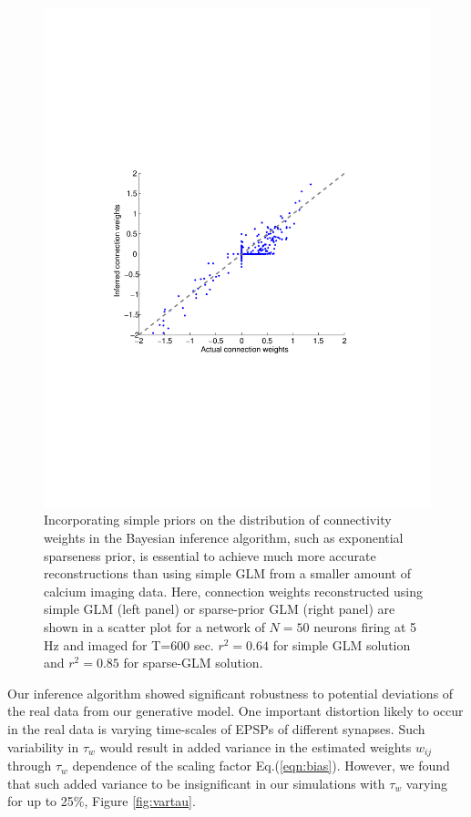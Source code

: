 \begin{figure}[h]
\begin{minipage}[c]{0.45\hsize}
\includegraphics[width=\hsize]{../figs/FigureA10_sparse_sol}
\end{minipage}
\caption{Incorporating simple priors on the distribution of connectivity weights in the Bayesian inference algorithm, such as exponential sparseness prior, is essential to achieve much more accurate reconstructions than using simple GLM from a smaller amount of calcium imaging data. Here, connection weights reconstructed using simple GLM (left panel) or sparse-prior GLM (right panel) are shown in a scatter plot for a network of $N=50$ neurons firing at 5 Hz and imaged for T=600 sec. $r^2=0.64$ for simple GLM solution and $r^2=0.85$ for sparse-GLM solution.}
\label{fig:sparse}
\end{figure}

Our inference algorithm showed significant robustness to potential deviations of the real data from our generative model.
One important distortion likely to occur in the real data is varying time-scales of EPSPs of different synapses.
Such variability in $\tau_w$ would result in added variance in the estimated weights $w_{ij}$ through $\tau_w$ dependence of the scaling factor Eq.(\ref{eqn:bias}).
However, we found that such added variance to be insignificant in our simulations with $\tau_w$ varying for up to 25\%, Figure \ref{fig:vartau}.


